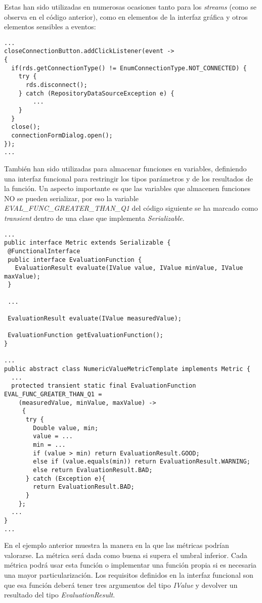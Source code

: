 Estas han sido utilizadas en numerosas ocasiones tanto para los \textit{streams} (como se observa en el código anterior), como en elementos de la interfaz gráfica y otros elementos sensibles a eventos:\\
\begin{minipage}{\linewidth}
{\tiny
\begin{verbatim}
...
closeConnectionButton.addClickListener(event ->  
{
  if(rds.getConnectionType() != EnumConnectionType.NOT_CONNECTED) {
	try {
	  rds.disconnect();
	} catch (RepositoryDataSourceException e) {
		...
	}
  }
  close();
  connectionFormDialog.open();
});
...
\end{verbatim}
}
\end{minipage}

También han sido utilizadas para almacenar funciones en variables, definiendo una interfaz funcional para restringir los tipos parámetros y de los resultados de la función. Un aspecto importante es que las variables que almacenen funciones NO se pueden serializar, por eso la variable \textit{EVAL\_FUNC\_GREATER\_THAN\_Q1} del código siguiente se ha marcado como \textit{transient} dentro de una clase que implementa \textit{Serializable}.

\begin{minipage}{\linewidth}
{\tiny
\begin{verbatim}
...
public interface Metric extends Serializable {
 @FunctionalInterface
 public interface EvaluationFunction {
   EvaluationResult evaluate(IValue value, IValue minValue, IValue maxValue);
 }

 ...
 
 EvaluationResult evaluate(IValue measuredValue);

 EvaluationFunction getEvaluationFunction();
}

...
public abstract class NumericValueMetricTemplate implements Metric {
  ...
  protected transient static final EvaluationFunction EVAL_FUNC_GREATER_THAN_Q1 = 
    (measuredValue, minValue, maxValue) -> 
     {
      try {
        Double value, min;
	    value = ...
	    min = ...
	    if (value > min) return EvaluationResult.GOOD;
	    else if (value.equals(min)) return EvaluationResult.WARNING;
	    else return EvaluationResult.BAD;
	  } catch (Exception e){
	    return EvaluationResult.BAD;
	  }
    };
  ...
}
...
\end{verbatim}
}
\end{minipage}

En el ejemplo anterior muestra la manera en la que las métricas podrían valorarse. La métrica será dada como buena si supera el umbral inferior. Cada métrica podrá usar esta función o implementar una función propia si es necesaria una mayor particularización. Los requisitos definidos en la interfaz funcional son que esa función deberá tener tres argumentos del tipo \textit{IValue} y devolver un resultado del tipo \textit{EvaluationResult}.

